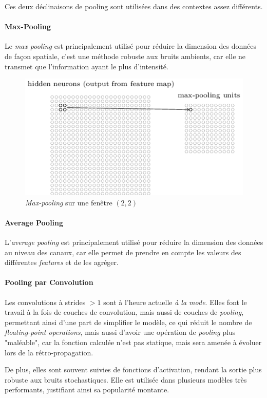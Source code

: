 \documentclass[a4paper, 10pt]{report}
\begin{document}
Ces deux déclinaisons de pooling sont utilisées dans des contextes assez différents.
\paragraph{Max-Pooling}
Le \emph{max pooling} est principalement utilisé pour réduire la dimension des données de façon spatiale, c'est une méthode robuste aux bruits ambients, car elle ne transmet que l'information ayant le plus d'intensité.
\begin{figure}[H]
	\begin{center}
		\includegraphics[scale=0.6]{Images/Pooling_Layer.png}
		\caption{\emph{Max-pooling} sur une fenêtre $(2,2)$}
	\end{center}
\end{figure}
\paragraph{Average Pooling}
L'\emph{average pooling} est principalement utilisé pour réduire la dimension des données au niveau des canaux, car elle permet de prendre en compte les valeurs des différentes \emph{features} et de les agréger.
\paragraph{Pooling par Convolution}
Les convolutions à strides $>1$ sont à l'heure actuelle \emph{à la mode}. Elles font le travail à la fois de couches de convolution, mais aussi de couches de \emph{pooling}, permettant ainsi d'une part de simplifier le modèle, ce qui réduit le nombre de \emph{floating-point operations}, mais aussi d'avoir une opération de \emph{pooling} plus "maléable", car la fonction calculée n'est pas statique, mais sera amenée à évoluer lors de la rétro-propagation.

De plus, elles sont souvent suivies de fonctions d'activation, rendant la sortie plus robuste aux bruits stochastiques.
Elle est utilisée dans plusieurs modèles très performants, justifiant ainsi sa popularité montante.
\end{document}

